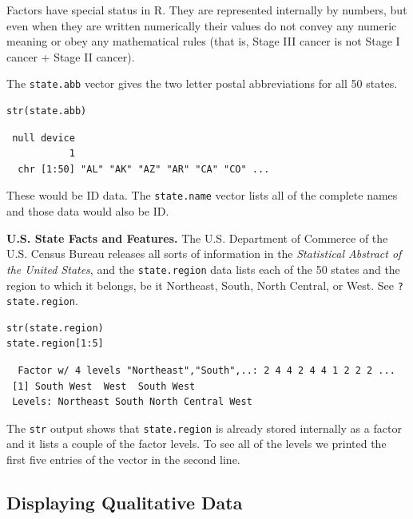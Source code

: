 \documentclass[captions=tableheading]{scrbook}
\begin{document}
Factors have special status in \textsf{R}. They are represented internally by numbers, but even when they are written numerically their values do not convey any numeric meaning or obey any mathematical rules (that is, Stage III cancer is not Stage I cancer + Stage II cancer).

\begin{example}
The \texttt{state.abb}
vector gives the two letter postal abbreviations for all 50 states.


\begin{verbatim}
str(state.abb)
\end{verbatim}

\begin{verbatim}
 null device 
           1
  chr [1:50] "AL" "AK" "AZ" "AR" "CA" "CO" ...
\end{verbatim}

These would be ID data. The \texttt{state.name} vector lists all of the complete names and those data would also be ID.
\end{example}

\begin{example}
\textbf{U.S. State Facts and Features.} The U.S. Department of Commerce of the U.S. Census Bureau releases all sorts of information in the \emph{Statistical Abstract of the United States}, and the \texttt{state.region} data lists each of the 50 states and the region to which it belongs, be it Northeast, South, North Central, or West. See \texttt{?state.region}.


\begin{verbatim}
str(state.region)
state.region[1:5]
\end{verbatim}

\begin{verbatim}
  Factor w/ 4 levels "Northeast","South",..: 2 4 4 2 4 4 1 2 2 2 ...
 [1] South West  West  South West 
 Levels: Northeast South North Central West
\end{verbatim}

The \texttt{str} output shows that \texttt{state.region} is already stored internally as a factor and it lists a couple of the factor levels. To see all of the levels we printed the first five entries of the vector in the second line.
\end{example}
\subsection{Displaying Qualitative Data}
\label{sec-3-1-4}
\end{document}
